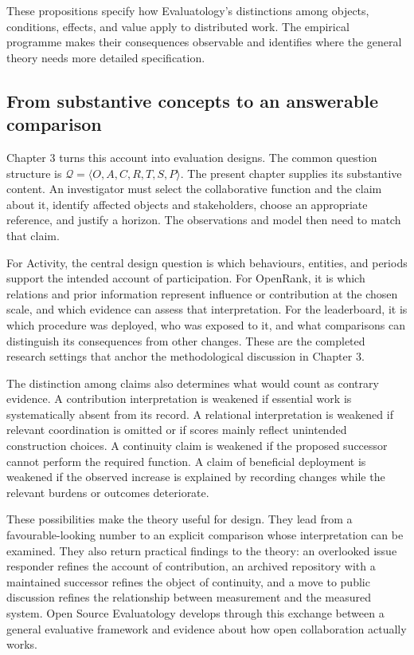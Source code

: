 These propositions specify how Evaluatology's distinctions among objects, conditions, effects, and value apply to distributed work. The empirical programme makes their consequences observable and identifies where the general theory needs more detailed specification.

\subsection{From substantive concepts to an answerable comparison}
Chapter 3 turns this account into evaluation designs. The common question structure is \(\mathcal Q=\langle O,A,C,R,T,S,P\rangle\). The present chapter supplies its substantive content. An investigator must select the collaborative function and the claim about it, identify affected objects and stakeholders, choose an appropriate reference, and justify a horizon. The observations and model then need to match that claim.

For Activity, the central design question is which behaviours, entities, and periods support the intended account of participation. For OpenRank, it is which relations and prior information represent influence or contribution at the chosen scale, and which evidence can assess that interpretation. For the leaderboard, it is which procedure was deployed, who was exposed to it, and what comparisons can distinguish its consequences from other changes. These are the completed research settings that anchor the methodological discussion in Chapter 3.

The distinction among claims also determines what would count as contrary evidence. A contribution interpretation is weakened if essential work is systematically absent from its record. A relational interpretation is weakened if relevant coordination is omitted or if scores mainly reflect unintended construction choices. A continuity claim is weakened if the proposed successor cannot perform the required function. A claim of beneficial deployment is weakened if the observed increase is explained by recording changes while the relevant burdens or outcomes deteriorate.

These possibilities make the theory useful for design. They lead from a favourable-looking number to an explicit comparison whose interpretation can be examined. They also return practical findings to the theory: an overlooked issue responder refines the account of contribution, an archived repository with a maintained successor refines the object of continuity, and a move to public discussion refines the relationship between measurement and the measured system. Open Source Evaluatology develops through this exchange between a general evaluative framework and evidence about how open collaboration actually works.
